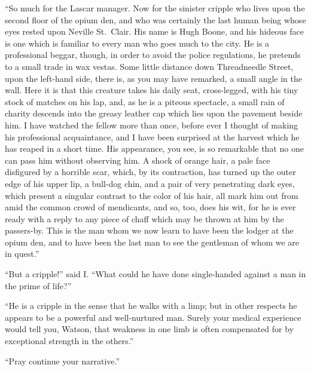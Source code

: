 “So much for the Lascar manager. Now for the sinister
cripple who lives upon the second floor of the opium den,
and who was certainly the last human being whose eyes rested
upon Neville St.~Clair. His name is Hugh Boone, and his
hideous face is one which is familiar to every man who goes
much to the city. He is a professional beggar, though, in
order to avoid the police regulations, he pretends to a small
trade in wax vestas. Some little distance down Threadneedle
Street, upon the left-hand side, there is, as you may have remarked,
a small angle in the wall. Here it is that this creature
takes his daily seat, cross-legged, with his tiny stock of
matches on his lap, and, as he is a piteous spectacle, a small
rain of charity descends into the greasy leather cap which lies
upon the pavement beside him. I have watched the fellow
more than once, before ever I thought of making his professional
acquaintance, and I have been surprised at the harvest
which he has reaped in a short time. His appearance, you
see, is so remarkable that no one can pass him without observing
him. A shock of orange hair, a pale face disfigured
by a horrible scar, which, by its contraction, has turned up
the outer edge of his upper lip, a bull-dog chin, and a pair of
very penetrating dark eyes, which present a singular contrast
to the color of his hair, all mark him out from amid the common
crowd of mendicants, and so, too, does his wit, for he is
ever ready with a reply to any piece of chaff which may be
thrown at him by the passers-by. This is the man whom we
now learn to have been the lodger at the opium den, and to
have been the last man to see the gentleman of whom we are
in quest.”

“But a cripple!” said I. “What could he have done
single-handed against a man in the prime of life?”

“He is a cripple in the sense that he walks with a limp;
but in other respects he appears to be a powerful and well-nurtured
man. Surely your medical experience would tell
you, Watson, that weakness in one limb is often compensated
for by exceptional strength in the others.”

“Pray continue your narrative.”

